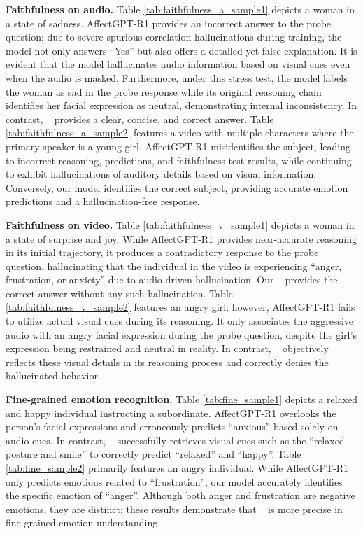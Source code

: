 \documentclass{article}
\theoremstyle{plain}
\theoremstyle{definition}
\theoremstyle{remark}
\begin{document}
\noindent\textbf{Faithfulness on audio.} 
Table \ref{tab:faithfulness_a_sample1} depicts a woman in a state of sadness. AffectGPT-R1 provides an incorrect answer to the probe question; due to severe spurious correlation hallucinations during training, the model not only answers ``Yes'' but also offers a detailed yet false explanation. It is evident that the model hallucinates audio information based on visual cues even when the audio is masked. Furthermore, under this stress test, the model labels the woman as sad in the probe response while its original reasoning chain identifies her facial expression as neutral, demonstrating internal inconsistency. In contrast, \ourmethod~ provides a clear, concise, and correct answer.
Table \ref{tab:faithfulness_a_sample2} features a video with multiple characters where the primary speaker is a young girl. AffectGPT-R1 misidentifies the subject, leading to incorrect reasoning, predictions, and faithfulness test results, while continuing to exhibit hallucinations of auditory details based on visual information. Conversely, our model identifies the correct subject, providing accurate emotion predictions and a hallucination-free response.

\noindent\textbf{Faithfulness on video.} 
Table \ref{tab:faithfulness_v_sample1} depicts a woman in a state of surprise and joy. While AffectGPT-R1 provides near-accurate reasoning in its initial trajectory, it produces a contradictory response to the probe question, hallucinating that the individual in the video is experiencing ``anger, frustration, or anxiety'' due to audio-driven hallucination. Our \ourmethod~ provides the correct answer without any such hallucination.
Table \ref{tab:faithfulness_v_sample2} features an angry girl; however, AffectGPT-R1 fails to utilize actual visual cues during its reasoning. It only associates the aggressive audio with an angry facial expression during the probe question, despite the girl's expression being restrained and neutral in reality. In contrast, \ourmethod~ objectively reflects these visual details in its reasoning process and correctly denies the hallucinated behavior.


\noindent\textbf{Fine-grained emotion recognition.} 
Table \ref{tab:fine_sample1} depicts a relaxed and happy individual instructing a subordinate. AffectGPT-R1 overlooks the person's facial expressions and erroneously predicts ``anxious'' based solely on audio cues. In contrast, \ourmethod~ successfully retrieves visual cues such as the ``relaxed posture and smile'' to correctly predict ``relaxed'' and ``happy''. 
Table \ref{tab:fine_sample2} primarily features an angry individual. While AffectGPT-R1 only predicts emotions related to ``frustration'', our model accurately identifies the specific emotion of ``anger''. Although both anger and frustration are negative emotions, they are distinct; these results demonstrate that \ourmethod~ is more precise in  fine-grained emotion understanding.
\end{document}
